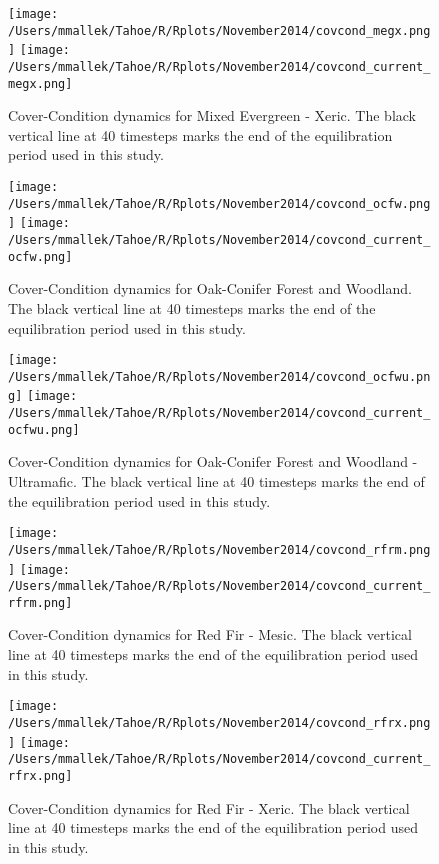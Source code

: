 \begin{figure}
\caption{Cover-Condition dynamics for Mixed Evergreen - Xeric. The black vertical line at 40 timesteps marks the end of the equilibration period used in this study.} 
\texttt{[image: /Users/mmallek/Tahoe/R/Rplots/November2014/covcond\_megx.png]}
\texttt{[image: /Users/mmallek/Tahoe/R/Rplots/November2014/covcond\_current\_megx.png]}
\label{covcond_megx}
\end{figure}

\begin{figure}
\texttt{[image: /Users/mmallek/Tahoe/R/Rplots/November2014/covcond\_ocfw.png]}
\texttt{[image: /Users/mmallek/Tahoe/R/Rplots/November2014/covcond\_current\_ocfw.png]}
\caption{Cover-Condition dynamics for Oak-Conifer Forest and Woodland. The black vertical line at 40 timesteps marks the end of the equilibration period used in this study.} 
\label{covcond_ocfw}
\end{figure}

\begin{figure}
\texttt{[image: /Users/mmallek/Tahoe/R/Rplots/November2014/covcond\_ocfwu.png]}
\texttt{[image: /Users/mmallek/Tahoe/R/Rplots/November2014/covcond\_current\_ocfwu.png]}
\caption{Cover-Condition dynamics for Oak-Conifer Forest and Woodland - Ultramafic. The black vertical line at 40 timesteps marks the end of the equilibration period used in this study.} 
\label{covcond_ocfwu}
\end{figure}

\begin{figure}
\texttt{[image: /Users/mmallek/Tahoe/R/Rplots/November2014/covcond\_rfrm.png]}
\texttt{[image: /Users/mmallek/Tahoe/R/Rplots/November2014/covcond\_current\_rfrm.png]}
\caption{Cover-Condition dynamics for Red Fir - Mesic. The black vertical line at 40 timesteps marks the end of the equilibration period used in this study.} 
\label{covcond_rfrm}
\end{figure}

\begin{figure}
\texttt{[image: /Users/mmallek/Tahoe/R/Rplots/November2014/covcond\_rfrx.png]}
\texttt{[image: /Users/mmallek/Tahoe/R/Rplots/November2014/covcond\_current\_rfrx.png]}
\caption{Cover-Condition dynamics for Red Fir - Xeric. The black vertical line at 40 timesteps marks the end of the equilibration period used in this study.} 
\label{covcond_rfrx}
\end{figure}

